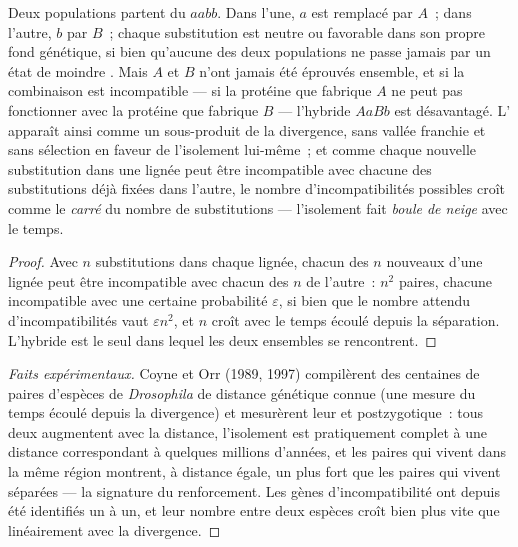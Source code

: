 \begin{theorem}\label{thm:b2:speciation:dm}
Deux populations partent du  $aabb$. Dans l'une, $a$ est remplacé
par $A$~; dans l'autre, $b$ par $B$~; chaque substitution est neutre ou
favorable dans son propre fond génétique, si bien qu'aucune des deux
populations ne passe jamais par un état de moindre . Mais
$A$ et $B$ n'ont jamais été éprouvés ensemble, et si la combinaison est
incompatible --- si la protéine que fabrique $A$ ne peut pas fonctionner
avec la protéine que fabrique $B$ --- l'hybride $AaBb$ est désavantagé.
L' apparaît ainsi comme un sous-produit de la
divergence, sans vallée franchie et sans sélection en faveur de
l'isolement lui-même~; et comme chaque nouvelle substitution dans une
lignée peut être incompatible avec chacune des substitutions déjà fixées
dans l'autre, le nombre d'incompatibilités possibles croît comme le
\emph{carré} du nombre de substitutions --- l'isolement fait \emph{boule
de neige} avec le temps.
\end{theorem}
\begin{proof}
Avec $n$ substitutions dans chaque lignée, chacun des $n$ nouveaux 
d'une lignée peut être incompatible avec chacun des $n$  de
l'autre~: $n^{2}$ paires, chacune incompatible avec une certaine probabilité
$\varepsilon$, si bien que le nombre attendu d'incompatibilités vaut
$\varepsilon n^{2}$, et $n$ croît avec le temps écoulé depuis la
séparation. L'hybride est le seul  dans lequel les deux ensembles
se rencontrent.
\end{proof}
\begin{proof}[Faits expérimentaux]
Coyne et Orr (1989, 1997) compilèrent des centaines de paires d'espèces
de \emph{Drosophila} de distance génétique connue (une mesure du temps
écoulé depuis la divergence) et mesurèrent leur  et
postzygotique~: tous deux augmentent avec la distance, l'isolement est
pratiquement complet à une distance correspondant à quelques millions
d'années, et les paires qui vivent dans la même région montrent, à
distance égale, un  plus fort que les paires qui
vivent séparées --- la signature du renforcement. Les gènes
d'incompatibilité ont depuis été identifiés un à un, et leur nombre entre
deux espèces croît bien plus vite que linéairement avec la divergence.
\end{proof}

